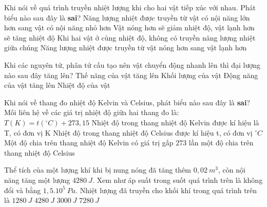 \begin{ex}
Khi nói về quá trình truyền nhiệt lượng khi cho hai vật tiếp xúc với nhau. Phát biểu nào sau đây là \textbf{sai}?
\choice
{\True Năng lượng nhiệt được truyền từ vật có nội năng lớn hơn sang vật có nội năng nhỏ hơn}
{Vật nóng hơn sẽ giảm nhiệt độ, vật lạnh hơn sẽ tăng nhiệt độ}
{Khi hai vật ở cùng nhiệt độ, không có truyền năng lượng nhiệt giữa chúng}
{Năng lượng nhiệt được truyền từ vật nóng hơn sang vật lạnh hơn}
\loigiai{}
\end{ex}
\begin{ex}
Khi các nguyên tử, phân tử cấu tạo nên vật chuyển động nhanh lên thì đại lượng nào sau đây tăng lên?
\choice
{Thế năng của vật tăng lên}
{Khối lượng của vật}
{Động năng của vật tăng lên}
{\True Nhiệt độ của vật}
\loigiai{}
\end{ex}
\begin{ex}
Khi nói về thang đo nhiệt độ Kelvin và Celsius, phát biểu nào sau đây là \textbf{sai}?
\choice
{Mối liên hệ về các giá trị nhiệt độ giữa hai thang đo là: $T(K) = t(^{\circ}C) + 273,15$}
{Nhiệt độ trong thang nhiệt độ Kelvin được kí hiệu là T, có đơn vị K}
{Nhiệt độ trong thang nhiệt độ Celsius được kí hiệu t, có đơn vị $^{\circ}C$}
{\True Một độ chia trên thang nhiệt độ Kelvin có giá trị gấp $273$ lần một độ chia trên thang nhiệt độ Celsius}
\loigiai{}
\end{ex}
\begin{ex}
Thể tích của một lượng khí khi bị nung nóng đã tăng thêm $0,02\ m^3$, còn nội năng tăng một lượng $4280\ J$. Xem như áp suất trong suốt quá trình trên là không đổi và bằng $1,5.10^5\ Pa$. Nhiệt lượng đã truyền cho khối khí trong quá trình trên là
\choice
{$1280\ J$}
{$4280\ J$}
{$3000\ J$}
{\True $7280\ J$}
\loigiai{}
\end{ex}
\begin{ex}
{
}
\loigiai{}
\end{ex}
